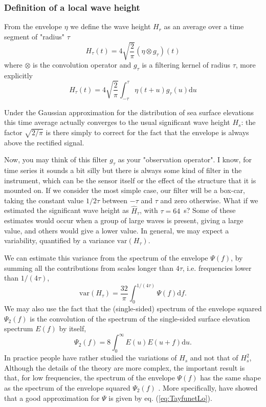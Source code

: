 {\subsubsection{Definition of a local wave height}
From the envelope $\eta$ we define the wave height $H_{r}$ as an average over a time segment of "radius" $\tau$
\begin{equation}
    H_{\tau}(t) = 4\sqrt{\frac{2}{\pi}} (\eta \otimes g_{\tau})(t)
   \label{eq:relation_Hs_eta}
\end{equation}
where $\otimes$ is the convolution operator and $g_{\tau}$ is a filtering kernel of radius $\tau$, more explicitly 
\begin{equation}
    H_{\tau}(t) = 4\sqrt{\frac{2}{\pi}} \int_{-\tau}^\tau \eta(t+u)   g_{\tau}(u) {\mathrm d}u
   \label{eq:relation_Hs_eta}
\end{equation}

Under the Gaussian approximation for the distribution of sea surface elevations this time average actually converges to the usual significant wave height $H_s$: the factor $\sqrt{{2}/{\pi}}$ is there simply to correct for the fact that the envelope is always above the rectified signal. 

Now, you may think of this filter $g_\tau$ as your "observation operator". I know, for time series it sounds a bit silly but there is always some kind of filter in the instrument, which can be the sensor itself or the effect of the structure that it is mounted on. If we consider the most simple case, our filter will be a box-car, taking the constant value $1/2\tau$ between $-\tau$ and $\tau$ and zero otherwise. What if we estimated the significant wave height as  $\widehat{H}_\tau$, with $\tau=64$~s? Some of these estimates would occur when a group of large waves is present, giving a large value, and others would give a lower value. In general, we may expect a variability, quantified by a variance $   \mathrm{var}(H_\tau)$. 

We can estimate this variance from the spectrum of the envelope $\Psi (f)$, by summing all the contributions from scales longer than $4 \tau$, i.e. frequencies lower than $1/(4 \tau)$, 
\begin{equation}
   \mathrm{var}(H_\tau) = \frac{32}{\pi} \int_0^{1/(4 \tau)} \Psi (f) {\mathrm d} f.
   \label{eq:relation_Hs_eta}
\end{equation}
We may also use the fact that the (single-sided) spectrum of the envelope squared  $\Psi_2(f)$ is the convolution of the spectrum of the single-sided
surface elevation spectrum $E(f)$ by itself,
\begin{equation}
    \Psi_{2}(f) = 8 \int_0^\infty E(u)E(u+f)\mathrm{d}u. 
\label{eq:psi2_1sided}
\end{equation}
 In practice people have rather studied the variations of $H_s$ and not that of $H_s^2$, 
 Although the details of the theory are more complex, the important result is that, for low frequencies, the spectrum of the envelope $\Psi(f)$ has the same shape as the spectrum of the envelope squared $\Psi_2(f)$ \citep{Rice1944}. More specifically, \cite{Tayfun&Lo1989} have showed that a good approximation for $\Psi$ is given by eq. (\ref{eq:TayfunetLo}). 

}
